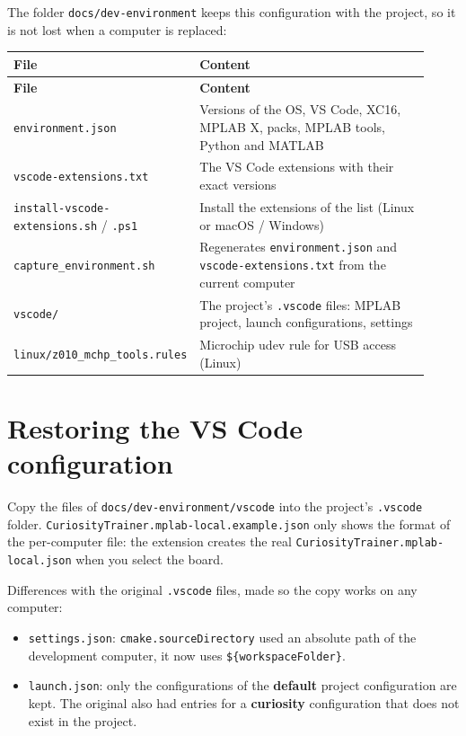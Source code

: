\documentclass[
  11pt,
  letterpaper,
  oneside,
  DIV=13,               %
  parskip=half,          %
  headings=normal,
  chapterprefix=false,
  toc=listof,
  numbers=noenddot,
]{scrbook}
\begin{document}
The folder \texttt{docs/\allowbreak{}dev-\allowbreak{}environment} keeps this configuration with the project, so it is not lost when a computer is replaced:
\begin{longtable}{>{\raggedright\arraybackslash}p{0.36\linewidth}>{\raggedright\arraybackslash}p{0.56\linewidth}}
\toprule
\textbf{File} & \textbf{Content} \\
\midrule
\endfirsthead
\toprule
\textbf{File} & \textbf{Content} \\
\midrule
\endhead
\bottomrule
\endlastfoot
\texttt{environment.\allowbreak{}json} & Versions of the OS, VS Code, XC16, MPLAB X, packs, MPLAB tools, Python and MATLAB \\
\texttt{vscode-\allowbreak{}extensions.\allowbreak{}txt} & The VS Code extensions with their exact versions \\
\texttt{install-\allowbreak{}vscode-\allowbreak{}extensions.\allowbreak{}sh} / \texttt{.\allowbreak{}ps1} & Install the extensions of the list (Linux or macOS / Windows) \\
\texttt{capture\_\allowbreak{}environment.\allowbreak{}sh} & Regenerates \texttt{environment.\allowbreak{}json} and \texttt{vscode-\allowbreak{}extensions.\allowbreak{}txt} from the current computer \\
\texttt{vscode/\allowbreak{}} & The project's \texttt{.\allowbreak{}vscode} files: MPLAB project, launch configurations, settings \\
\texttt{linux/\allowbreak{}z010\_\allowbreak{}mchp\_\allowbreak{}tools.\allowbreak{}rules} & Microchip udev rule for USB access (Linux) \\
\end{longtable}

\section{Restoring the VS Code configuration}

Copy the files of \texttt{docs/\allowbreak{}dev-\allowbreak{}environment/\allowbreak{}vscode} into the project's \texttt{.\allowbreak{}vscode} folder. \texttt{CuriosityTrainer.\allowbreak{}mplab-\allowbreak{}local.\allowbreak{}example.\allowbreak{}json} only shows the format of the per-computer file: the extension creates the real \texttt{CuriosityTrainer.\allowbreak{}mplab-\allowbreak{}local.\allowbreak{}json} when you select the board.

Differences with the original \texttt{.\allowbreak{}vscode} files, made so the copy works on any computer:
\begin{itemize}
\item \texttt{settings.\allowbreak{}json}: \texttt{cmake.\allowbreak{}sourceDirectory} used an absolute path of the development computer, it now uses \texttt{\$\{workspaceFolder\}}.
\item \texttt{launch.\allowbreak{}json}: only the configurations of the \textbf{default} project configuration are kept. The original also had entries for a \textbf{curiosity} configuration that does not exist in the project.
\end{itemize}
\end{document}
